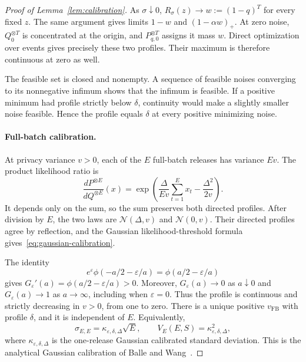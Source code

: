 \documentclass[11pt]{article}
\theoremstyle{remark}
\newcommand{\Normal}{\mathcal N}
\begin{document}
\begin{proof}[Proof of Lemma~\ref{lem:calibration}]
As $\sigma\downarrow0$, $R_\sigma(z)\to w:=(1-q)^T$ for every fixed $z$.
The same argument gives limits $1-w$ and $(1-\alpha w)_+$. At zero noise,
$Q_0^{\otimes T}$ is concentrated at the origin, and $P_{q,0}^{\otimes T}$
assigns it mass $w$. Direct optimization over events gives precisely these
two profiles. Their maximum is therefore continuous at zero as well.

The feasible set is closed and nonempty. A sequence of feasible noises
converging to its nonnegative infimum shows that the infimum is feasible.
If a positive minimum had profile strictly below $\delta$, continuity would
make a slightly smaller noise feasible. Hence the profile equals $\delta$
at every positive minimizing noise.

\paragraph{Full-batch calibration.}
At privacy variance $v>0$, each of the $E$ full-batch releases has variance
$Ev$. The product likelihood ratio is
\[
 \frac{dP^{\otimes E}}{dQ^{\otimes E}}(x)
 =\exp\left(\frac{\Delta}{Ev}\sum_{t=1}^E x_t
                     -\frac{\Delta^2}{2v}\right).
\]
It depends only on the sum, so the sum preserves both directed profiles.
After division by $E$, the two laws are $\Normal(\Delta,v)$ and
$\Normal(0,v)$. Their directed profiles agree by reflection, and the Gaussian
likelihood-threshold formula gives~\eqref{eq:gaussian-calibration}.

The identity
\[
 e^\varepsilon\phi(-a/2-\varepsilon/a)=\phi(a/2-\varepsilon/a)
\]
gives $G_\varepsilon'(a)=\phi(a/2-\varepsilon/a)>0$. Moreover,
$G_\varepsilon(a)\to0$ as $a\downarrow0$ and
$G_\varepsilon(a)\to1$ as $a\to\infty$, including when $\varepsilon=0$.
Thus the profile is continuous and strictly decreasing in $v>0$, from one
to zero. There is a unique positive $v_{\mathrm{FB}}$ with profile $\delta$,
and it is independent of $E$. Equivalently,
\begin{equation}\label{eq:fullbatch}
 \sigma_{E,E}=\kappa_{\varepsilon,\delta,\Delta}\sqrt E,
 \qquad V_E(E,S)=\kappa_{\varepsilon,\delta,\Delta}^2,
\end{equation}
where $\kappa_{\varepsilon,\delta,\Delta}$ is the one-release Gaussian
calibrated standard deviation. This is the analytical Gaussian calibration
of Balle and Wang~\cite{ballewang2018}.


\end{proof}
\end{document}
